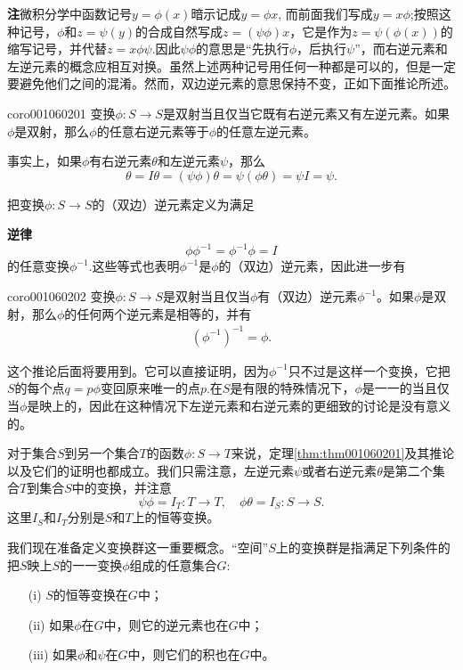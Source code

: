 \textbf{注}\quad 微积分学中函数记号$y = \phi(x)$暗示记成$y = \phi{x}$, 而前面我们写成$y = x\phi$;按照这种记号，$\phi$和$z = \psi(y)$的合成自然写成$z = (\psi\phi)x$，它是作为$z = \psi(\phi(x))$的缩写记号，并代替$z = x\phi\psi$.因此$\psi\phi$的意思是“先执行$\phi$，后执行$\psi$”，而右逆元素和左逆元素的概念应相互对换。虽然上述两种记号用任何一种都是可以的，但是一定要避免他们之间的混淆。然而，双边逆元素的意思保持不变，正如下面推论所述。

\begin{corollary}{}{coro001060201}
变换$\phi:S \to S$是双射当且仅当它既有右逆元素又有左逆元素。如果$\phi$是双射，那么$\phi$的任意右逆元素等于$\phi$的任意左逆元素。
\end{corollary}

事实上，如果$\phi$有右逆元素$\theta$和左逆元素$\psi$，那么
\[
\theta = I\theta = (\psi\phi)\theta = \psi(\phi\theta) = \psi{}I = \psi.
\]

把变换$\phi:S \to S$的（双边）逆元素定义为满足

\textbf{逆律}
\[
\phi\phi^{-1} = \phi^{-1}\phi = I
\]
的任意变换$\phi^{-1}$.这些等式也表明$\phi^{-1}$是$\phi$的（双边）逆元素，因此进一步有
\begin{corollary}{}{coro001060202}
变换$\phi:S \to S$是双射当且仅当$\phi$有（双边）逆元素$\phi^{-1}$。如果$\phi$是双射，那么$\phi$的任何两个逆元素是相等的，并有
\begin{gather}\label{equ001060204}
(\phi^{-1})^{-1} = \phi.
\end{gather}
\end{corollary}

这个推论后面将要用到。它可以直接证明，因为$\phi^{-1}$只不过是这样一个变换，它把$S$的每个点$q = p\phi$变回原来唯一的点$p$.在$S$是有限的特殊情况下，$\phi$是一一的当且仅当$\phi$是映上的，因此在这种情况下左逆元素和右逆元素的更细致的讨论是没有意义的。

对于集合$S$到另一个集合$T$的函数$\phi: S \to T$来说，定理\ref{thm:thm001060201}及其推论以及它们的证明也都成立。我们只需注意，左逆元素$\psi$或者右逆元素$\theta$是第二个集合$T$到集合$S$中的变换，并注意
\[
\psi\phi = I_T: T \to T, \quad \phi\theta = I_S:S \to S.
\]
这里$I_S$和$I_T$分别是$S$和$T$上的恒等变换。

我们现在准备定义变换群这一重要概念。“空间”$S$上的变换群是指满足下列条件的把$S$映上$S$的一一变换$\phi$组成的任意集合$G$:
\begin{enumerate}
\item[(i)]$S$的恒等变换在$G$中；
\item[(ii)]如果$\phi$在$G$中，则它的逆元素也在$G$中；
\item[(iii)]如果$\phi$和$\psi$在$G$中，则它们的积也在$G$中。
\end{enumerate}

